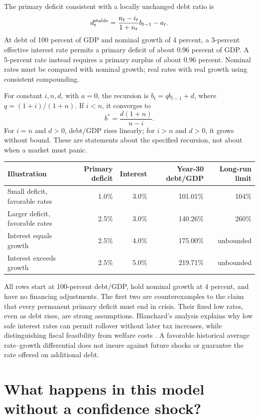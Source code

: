 \documentclass[11pt]{article}
\begin{document}
The primary deficit consistent with a locally unchanged debt ratio is
\[
d_t^{\rm stable}=\frac{n_t-i_t}{1+n_t}b_{t-1}-a_t.
\]
At debt of 100 percent of GDP and nominal growth of 4 percent, a 3-percent effective
interest rate permits a primary deficit of about 0.96 percent of GDP. A 5-percent rate
instead requires a primary surplus of about 0.96 percent. Nominal rates must be compared
with nominal growth; real rates with real growth using consistent compounding.

For constant $i,n,d$, with $a=0$, the recursion is $b_t=q b_{t-1}+d$, where
$q=(1+i)/(1+n)$. If $i<n$, it converges to
\[
b^*=\frac{d(1+n)}{n-i}.
\]
For $i=n$ and $d>0$, debt/GDP rises linearly; for $i>n$ and $d>0$, it grows without bound.
These are statements about the specified recursion, not about when a market must panic.

\begin{center}
\small
\begin{tabular}{lrrrr}
\toprule
Illustration & Primary deficit & Interest & Year-30 debt/GDP & Long-run limit\\
\midrule
Small deficit, favorable rates & 1.0\% & 3.0\% & 101.01\% & 104\%\\
Larger deficit, favorable rates & 2.5\% & 3.0\% & 140.26\% & 260\%\\
Interest equals growth & 2.5\% & 4.0\% & 175.00\% & unbounded\\
Interest exceeds growth & 2.5\% & 5.0\% & 219.71\% & unbounded\\
\bottomrule
\end{tabular}
\end{center}
All rows start at 100-percent debt/GDP, hold nominal growth at 4 percent, and have no
financing adjustments. The first two are counterexamples to the claim that every permanent
primary deficit must end in crisis. Their fixed low rates, even as debt rises, are strong
assumptions. Blanchard's analysis explains why low safe interest rates can permit rollover
without later tax increases, while distinguishing fiscal feasibility from welfare costs
\cite{blanchard}. A favorable historical average rate--growth differential does not insure
against future shocks or guarantee the rate offered on additional debt.

\section{What happens in this model without a confidence shock?}
\end{document}
